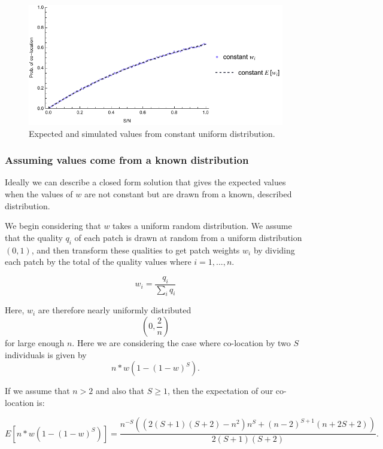 \begin{figure}[!hpt]
    \centering
    \includegraphics[width=0.75\linewidth]{figs/si/constant-expected.pdf}
    \caption{Expected and simulated values from constant uniform distribution.}
    \label{fig:constant}
\end{figure}

\subsubsection{Assuming values come from a known distribution}

Ideally we can describe a closed form solution that gives the expected values when the values of $w$ are not constant but are drawn from a known, described distribution.

We begin considering that $w$ takes a uniform random distribution. We assume that the quality $q_i$ of each patch is drawn at random from a uniform distribution $(0,1)$, and then transform these qualities to get patch weights $w_i$ by dividing each patch by the total of the quality values where $i = 1,...,n$. 

\begin{equation}
    w_i = \frac{q_i}{\sum_i{q_i}}
\end{equation}

Here, $w_i$ are therefore nearly uniformly distributed 
\begin{equation}
    (0, \frac{2}{n})
\end{equation} 
for large enough $n$. Here we are considering the case where co-location by two $S$ individuals is given by 
\begin{equation}
    n*w(1-(1-w)^S).
\end{equation} 

If we assume that $n>2$ and also that $S \geq 1$, then the expectation of our co-location is: 

\begin{equation}
    E[n*w(1-(1-w)^S)] = \frac{n^{-S} \left(\left(2 (S+1) (S+2)-n^2\right) n^S+(n-2)^{S+1} (n+2
   S+2)\right)}{2 (S+1) (S+2)}. 
   \label{eq:uniform-expectation}
\end{equation}

